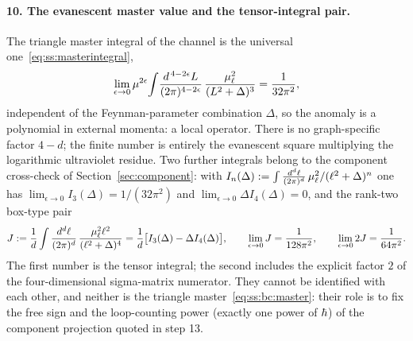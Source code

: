 \paragraph{10. The evanescent master value and the tensor-integral pair.}
The triangle master integral of the channel is the universal
one~\eqref{eq:ss:masterintegral},
\begin{equation}\label{eq:ss:bc:master}
\lim_{\epsilon\to0}\mu^{2\epsilon}\!\int\!
\frac{d^{\,4-2\epsilon}L}{(2\pi)^{4-2\epsilon}}\,
\frac{\mu_\ell^{2}}{(L^{2}+\Delta)^{3}}
=\frac{1}{32\pi^{2}} ,
\end{equation}
independent of the Feynman-parameter combination $\Delta$, so the anomaly is a
polynomial in external momenta: a local operator. There is no graph-specific
factor $4-d$; the finite number is entirely the evanescent square multiplying
the logarithmic ultraviolet residue. Two further integrals belong to the
component cross-check of Section~\ref{sec:component}: with
$I_{n}(\Delta):=\int\frac{d^{d}\ell}{(2\pi)^{d}}\,
\mu_\ell^{2}/(\ell^{2}+\Delta)^{n}$ one has
$\lim_{\epsilon\to0}I_{3}(\Delta)=1/(32\pi^{2})$ and
$\lim_{\epsilon\to0}\Delta I_{4}(\Delta)=0$, and the rank-two box-type pair
\begin{equation}\label{eq:ss:bc:Jpair}
J:=\frac1d\int\frac{d^{d}\ell}{(2\pi)^{d}}\,
\frac{\mu_\ell^{2}\ell^{2}}{(\ell^{2}+\Delta)^{4}}
=\frac1d\big[I_{3}(\Delta)-\Delta I_{4}(\Delta)\big],
\qquad
\lim_{\epsilon\to0}J=\frac{1}{128\pi^{2}},
\qquad
\lim_{\epsilon\to0}2J=\frac{1}{64\pi^{2}} .
\end{equation}
The first number is the tensor integral; the second includes the explicit
factor $2$ of the four-dimensional sigma-matrix numerator. They cannot be
identified with each other, and neither is the triangle
master~\eqref{eq:ss:bc:master}: their role is to fix the free sign and the
loop-counting power (exactly one power of $\hbar$) of the component projection
quoted in step 13.


